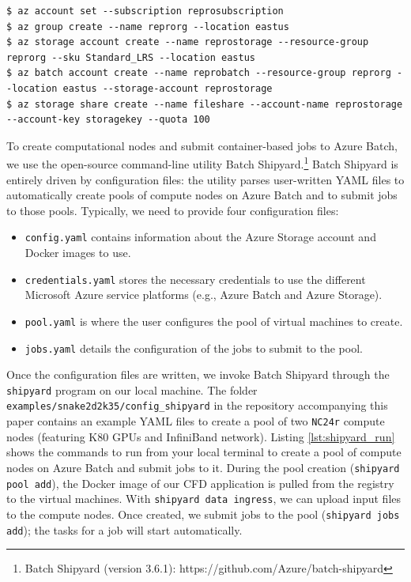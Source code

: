\documentclass[10pt,journal,compsoc]{IEEEtran}
\begin{document}
\begin{lstlisting}[label=lst:az_configure,caption={Configure the workspace on Microsoft Azure.}]
$ az account set --subscription reprosubscription
$ az group create --name reprorg --location eastus
$ az storage account create --name reprostorage --resource-group reprorg --sku Standard_LRS --location eastus
$ az batch account create --name reprobatch --resource-group reprorg --location eastus --storage-account reprostorage
$ az storage share create --name fileshare --account-name reprostorage --account-key storagekey --quota 100
\end{lstlisting}

To create computational nodes and submit container-based jobs to Azure Batch, we use the open-source command-line utility Batch Shipyard.\footnote{Batch Shipyard (version 3.6.1): https://github.com/Azure/batch-shipyard}
Batch Shipyard is entirely driven by configuration files: the utility parses user-written YAML files to automatically create pools of compute nodes on Azure Batch and to submit jobs to those pools.
Typically, we need to provide four configuration files:

\begin{itemize}
    \item \texttt{config.yaml} contains information about the Azure Storage account and Docker images to use.
    \item \texttt{credentials.yaml} stores the necessary credentials to use the different Microsoft Azure service platforms (e.g., Azure Batch and Azure Storage).
    \item \texttt{pool.yaml} is where the user configures the pool of virtual machines to create.
    \item \texttt{jobs.yaml} details the configuration of the jobs to submit to the pool.
\end{itemize}

Once the configuration files are written, we invoke Batch Shipyard through the \texttt{shipyard} program on our local machine.
The folder \texttt{examples/snake2d2k35/config\_shipyard} in the repository accompanying this paper contains an example YAML files to create a pool of two \texttt{NC24r} compute nodes (featuring K80 GPUs and InfiniBand network).
Listing \ref{lst:shipyard_run} shows the commands to run from your local terminal to create a pool of compute nodes on Azure Batch and submit jobs to it.
During the pool creation (\texttt{shipyard pool add}), the Docker image of our CFD application is pulled from the registry to the virtual machines.
With \texttt{shipyard data ingress}, we can upload input files to the compute nodes.
Once created, we submit jobs to the pool (\texttt{shipyard jobs add}); the tasks for a job will start automatically.
\end{document}
